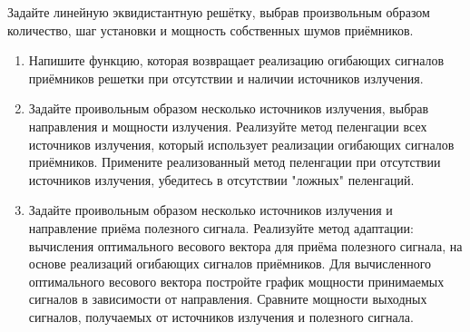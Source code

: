 \documentclass[a4paper,12pt]{article}
\newenvironment{Matlab}{\par \vspace{0.2cm}}{\vspace{0.2cm} \par}
\newcommand{\Mcommand}[1]{\noindent \texttt{> #1} \par}
\newcommand{\matlab}[1]{\begin{Matlab} \Mcommand{#1} \end{Matlab}}
\begin{document}
Задайте линейную эквидистантную решётку, выбрав произвольным образом количество, шаг установки и мощность собственных шумов приёмников.

\begin{enumerate}
    \item Напишите функцию, которая возвращает реализацию огибающих сигналов приёмников решетки при отсутствии и наличии источников излучения.
    \item Задайте проивольным образом несколько источников излучения, выбрав направления и мощности излучения. Реализуйте метод пеленгации
          всех источников излучения, который использует реализации огибающих сигналов приёмников. Примените реализованный метод пеленгации
          при отсутствии источников излучения, убедитесь в отсутствии "ложных"{} пеленгаций.
    \item Задайте проивольным образом несколько источников излучения и направление приёма полезного сигнала. Реализуйте метод
          адаптации: вычисления оптимального весового вектора для приёма полезного сигнала, на основе реализаций огибающих сигналов приёмников.
          Для вычисленного оптимального весового вектора постройте график мощности принимаемых сигналов в зависимости от направления.
          Сравните мощности выходных сигналов, получаемых от источников излучения и полезного сигнала.
\end{enumerate}



\end{document}

